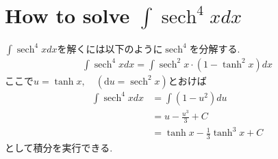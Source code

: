 \documentclass[dvipdfmx,11pt,a4paper,oneside,openany]{jsbook}
\begin{document}
\chapter{How to solve $\int \operatorname{sech}^{4} x d x$}
$\int \operatorname{sech}^{4} x d x$を解くには以下のように$\operatorname{sech}^4$を分解する.
\begin{align*}
    \int \operatorname{sech}^{4} x d x=\int \operatorname{sech}^{2} x \cdot\left(1-\tanh ^{2} x\right) d x
\end{align*}
ここで$u=\tanh x,\quad (\mathrm{d}u=\operatorname{sech}^2x)$とおけば
\begin{align*}
    \int \operatorname{sech}^{4} x d x & =\int\left(1-u^{2}\right) d u       \\
                                       & =u-\frac{u^{3}}{3}+C                \\
                                       & =\tanh x-\frac{1}{3} \tanh ^{3} x+C
\end{align*}
として積分を実行できる.
\end{document}

